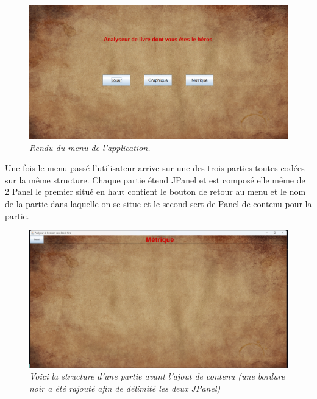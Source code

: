 \documentclass[a4paper,12pt]{article}
\begin{document}
\begin {figure}[h]
    \centering
    \includegraphics[width=\textwidth]{imgMenu.png}
{\small\textsl{Rendu du menu de l'application.}}
\end {figure}

Une fois le menu passé l'utilisateur arrive sur une des trois parties toutes codées sur la même structure. Chaque partie étend JPanel et est composé elle même de 2 Panel le premier situé en haut contient le bouton de retour au menu et le nom de la partie dans laquelle on se situe et le second sert de Panel de contenu pour la partie. 

\begin {figure}[h]
    \centering
    \includegraphics[width=\textwidth]{structureGUI.png}
{\small\textsl{Voici la structure d'une partie avant l'ajout de contenu (une bordure noir a été rajouté afin de délimité les deux JPanel)}}
\end {figure}
\newpage
\end{document}
